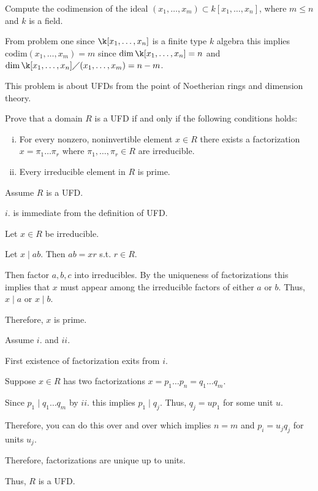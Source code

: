 \documentclass[12pt, letterpaper]{article}
\newcommand{\codim}{\mathrm{codim}}
\begin{document}
\begin{subproblem}{}
    Compute the codimension of the ideal $(x_1, \dots, x_m) \subset k[x_1,\dots , x_n]$, where $m \leq n$ and
$k$ is a field.
\end{subproblem}
\begin{problemproof}
    From problem one since $\k[x_1,\dots,x_n]$ is a finite type $k$ algebra this implies $\codim (x_1,\dots,x_m) = m$ since $\dim \k[x_1,\dots,x_n] = n$ and $\dim \k[x_1,\dots,x_n] \diagup (x_1,\dots,x_m) = n -m$.
\end{problemproof}

\begin{problem}{}
    This problem is about UFDs from the point of Noetherian rings and dimension theory.
\end{problem}
\addtocounter{subproblemcounter}{1}
\begin{subproblem}{}
    Prove that a domain $R$ is a UFD if and only if the following conditions holds:
    \begin{enumerate}[i.]
        \item For every nonzero, noninvertible element $x \in R$ there exists a factorization
$x = \pi_1 \dots \pi_r$ where $\pi_1, \dots , \pi_r \in R$ are irreducible.
        \item Every irreducible element in $R$ is prime.
    \end{enumerate}
\end{subproblem}
\begin{problemproof}
    Assume $R$ is a UFD.

    $i.$ is immediate from the definition of UFD.

    Let $x \in R$ be irreducible.

    Let $x \mid ab$. Then $ab=xr$ s.t. $r \in R$.

    Then factor $a,b,c$ into irreducibles. By the uniqueness of factorizations this implies that $x$ must appear
    among the irreducible factors of either $a$ or $b$. Thus, $x \mid a$ or $x \mid b$.

    Therefore, $x$ is prime.

    Assume $i.$ and $ii.$

    First existence of factorization exits from $i$.

    Suppose $x\in R$ has two factorizations $x=p_1\dots p_n = q_1 \dots q_m$.

    Since $p_1 \mid q_1 \dots q_m$ by $ii.$ this implies $p_1 \mid q_j$. Thus, $q_j = u p_1$ for some unit $u$.

    Therefore, you can do this over and over which implies $n=m$ and $p_i = u_j q_j$ for units $u_j$.

    Therefore, factorizations are unique up to units.

    Thus, $R$ is a UFD.
\end{problemproof}
\end{document}
